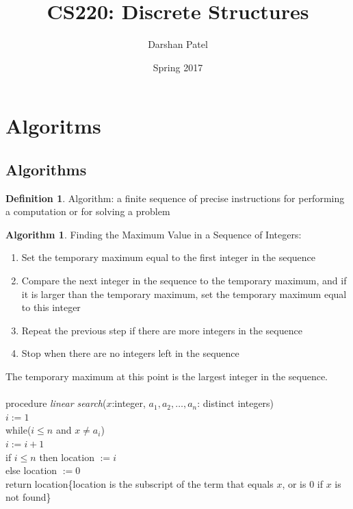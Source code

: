 \documentclass[12pt]{article}
\begin{document}
\theoremstyle{definition}
\newtheorem{alg}{Algorithm}[section]
\newtheorem{theorem}{Theorem}[section]
\newtheorem{definition}{Definition}[section]
\newtheorem{example}{Example}[section]


\title{CS220: Discrete Structures}
\author{Darshan Patel}
\date{Spring 2017}
\maketitle

\tableofcontents
 \newpage
 
\section{Algoritms}
\subsection{Algorithms} 
\begin{definition} Algorithm: a finite sequence of precise instructions for performing a computation or for solving a problem \end{definition}
\begin{alg} Finding the Maximum Value in a Sequence of Integers: 
\begin{enumerate}
\item Set the temporary maximum equal to the first integer in the sequence 
\item Compare the next integer in the sequence to the temporary maximum, and if it is larger than the temporary maximum, set the temporary maximum equal to this integer 
\item Repeat the previous step if there are more integers in the sequence 
\item Stop when there are no integers left in the sequence \end{enumerate} 
The temporary maximum at this point is the largest integer in the sequence. \\~\\
procedure \textit{linear search}($x$:integer, $a_1, a_2, \dots, a_n$: distinct integers) \\ $i := 1$ \\ while($i \leq n$ and $x \neq a_i$) \\ \indent $i := i + 1$ \\ if $i \leq n$ then location $:= i$ \\ else location $:= 0$ \\ return location\{location is the subscript of the term that equals $x$, or is 0 if $x$ is not found\} \end{alg}
\end{document}
